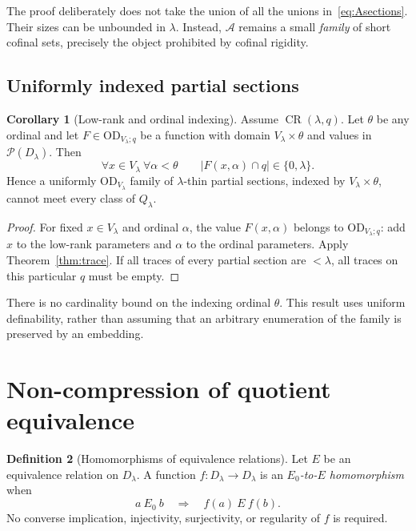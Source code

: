 \documentclass[11pt,letterpaper]{article}
\theoremstyle{definition}
\newtheorem{definition}{Definition}[section]
\newtheorem{corollary}[definition]{Corollary}
\numberwithin{equation}{section}
\newcommand{\OD}{\mathrm{OD}}
\newcommand{\Pow}{\mathcal P}
\newcommand{\D}{D_\lambda}
\newcommand{\Q}{Q_\lambda}
\newcommand{\ODlow}{\OD_{V_\lambda}}
\newcommand{\ODq}{\OD_{V_\lambda;q}}
\newcommand{\Rig}{\operatorname{CR}}
\begin{document}
The proof deliberately does not take the union of all the unions in~\eqref{eq:Asections}. Their sizes can be unbounded in $\lambda$. Instead, $\mathcal A$ remains a small \emph{family} of short cofinal sets, precisely the object prohibited by cofinal rigidity.

\subsection{Uniformly indexed partial sections}

\begin{corollary}[Low-rank and ordinal indexing]\label{cor:indexed}
Assume $\Rig(\lambda,q)$. Let $\theta$ be any ordinal and let $F\in\ODq$ be a function with domain $V_\lambda\times\theta$ and values in $\Pow(\D)$. Then
\[
\forall x\in V_\lambda\ \forall\alpha<\theta\qquad
|F(x,\alpha)\cap q|\in\{0,\lambda\}.
\]
Hence a uniformly $\ODlow$ family of $\lambda$-thin partial sections, indexed by $V_\lambda\times\theta$, cannot meet every class of $\Q$.
\end{corollary}
\begin{proof}
For fixed $x\in V_\lambda$ and ordinal $\alpha$, the value $F(x,\alpha)$ belongs to $\ODq$: add $x$ to the low-rank parameters and $\alpha$ to the ordinal parameters. Apply Theorem~\ref{thm:trace}. If all traces of every partial section are $<\lambda$, all traces on this particular $q$ must be empty.
\end{proof}

There is no cardinality bound on the indexing ordinal $\theta$. This result uses uniform definability, rather than assuming that an arbitrary enumeration of the family is preserved by an embedding.

\section{Non-compression of quotient equivalence}\label{sec:hom}

\begin{definition}[Homomorphisms of equivalence relations]
Let $E$ be an equivalence relation on $\D$. A function $f:\D\to\D$ is an \emph{$E_0$-to-$E$ homomorphism} when
\[
a\ E_0\ b\quad\Longrightarrow\quad f(a)\ E\ f(b).
\]
No converse implication, injectivity, surjectivity, or regularity of $f$ is required.
\end{definition}
\end{document}
